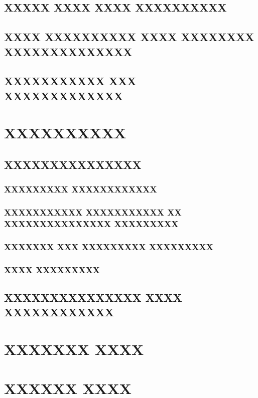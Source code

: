 \documentclass{acmart}
\begin{document}
\subsection{XXXXX XXXX XXXX XXXXXXXXXX}\subsection{XXXX XXXXXXXXXX XXXX XXXXXXXX XXXXXXXXXXXXXX}
\subsection{XXXXXXXXXXX XXX XXXXXXXXXXXXX}
\section{XXXXXXXXXX}\subsection{XXXXXXXXXXXXXXX}
\subsubsection{XXXXXXXXX XXXXXXXXXXXX}\subsubsection{XXXXXXXXXXX XXXXXXXXXXX XX XXXXXXXXXXXXXXX XXXXXXXXX}
\subsubsection{XXXXXXX XXX XXXXXXXXX XXXXXXXXX}\subsubsection{XXXX XXXXXXXXX}\subsection{XXXXXXXXXXXXXXX XXXX XXXXXXXXXXXX}
\section{XXXXXXX XXXX}
\section{XXXXXX XXXX}
\end{document}

